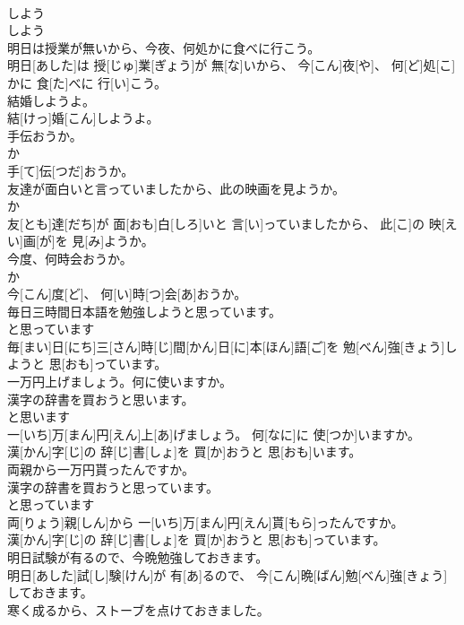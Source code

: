 \documentclass[8pt]{extreport}
\begin{document}
\begin{CJK}{UTF8}{min}
\\	しよう	
\\	しよう
\\	明日は授業が無いから、今夜、何処かに食べに行こう。	
\\	明日[あした]は 授[じゅ]業[ぎょう]が 無[な]いから、 今[こん]夜[や]、 何[ど]処[こ]かに 食[た]べに 行[い]こう。
\\	結婚しようよ。	
\\	結[けっ]婚[こん]しようよ。
\\	手伝おうか。	
\\	か 
\\	手[て]伝[つだ]おうか。
\\	友達が面白いと言っていましたから、此の映画を見ようか。	
\\	か 
\\	友[とも]達[だち]が 面[おも]白[しろ]いと 言[い]っていましたから、 此[こ]の 映[えい]画[が]を 見[み]ようか。
\\	今度、何時会おうか。	
\\	か 
\\	今[こん]度[ど]、 何[い]時[つ]会[あ]おうか。
\\	毎日三時間日本語を勉強しようと思っています。	
\\	と思っています 
\\	毎[まい]日[にち]三[さん]時[じ]間[かん]日[に]本[ほん]語[ご]を 勉[べん]強[きょう]しようと 思[おも]っています。
\\	一万円上げましょう。何に使いますか。 
\\	漢字の辞書を買おうと思います。	
\\	と思います 
\\	一[いち]万[まん]円[えん]上[あ]げましょう。 何[なに]に 使[つか]いますか。 
\\	漢[かん]字[じ]の 辞[じ]書[しょ]を 買[か]おうと 思[おも]います。
\\	両親から一万円貰ったんですか。 
\\	漢字の辞書を買おうと思っています。	
\\	と思っています 
\\	両[りょう]親[しん]から 一[いち]万[まん]円[えん]貰[もら]ったんですか。 
\\	漢[かん]字[じ]の 辞[じ]書[しょ]を 買[か]おうと 思[おも]っています。
\\	明日試験が有るので、今晩勉強しておきます。	
\\	明日[あした]試[し]験[けん]が 有[あ]るので、 今[こん]晩[ばん]勉[べん]強[きょう]しておきます。
\\	寒く成るから、ストーブを点けておきました。	

\end{CJK}
\end{document}
